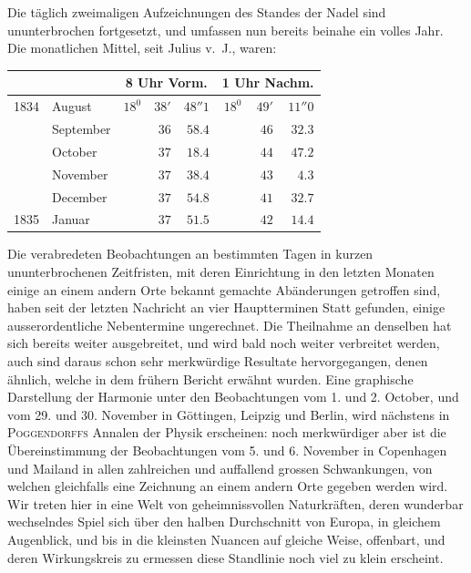 Die täglich zweimaligen Aufzeichnungen des Standes der Nadel sind ununterbrochen fortgesetzt, und umfassen nun bereits beinahe ein volles Jahr. Die monatlichen Mittel, seit Julius v.\ J., waren:
\begin{center}
\begin{tabular}{rl|rrr|rrr}
 & & \multicolumn{3}{c|}{8 Uhr Vorm.} & \multicolumn{3}{c}{1 Uhr Nachm.}\\\hline
1834 & August & $18^0$ & $38'$ & $48''1$ & $18^0$ & $49'$ & $11''0$\\
 & September & & $36$ & $58.4$ & & $46$ & $32.3$\\
 & October & & $37$ & $18.4$ & & $44$ & $47.2$\\
 & November & & $37$ & $38.4$ & & $43$ & $4.3$\\
 & December & & $37$ & $54.8$ & & $41$ & $32.7$\\
1835 & Januar & & $37$ & $51.5$ & & $42$ & $14.4$
\end{tabular}
\end{center}

Die verabredeten Beobachtungen an bestimmten Tagen in kurzen ununterbrochenen Zeitfristen, mit deren Einrichtung in den letzten Monaten einige an einem andern Orte bekannt gemachte Abänderungen getroffen sind, haben seit der letzten Nachricht an vier Hauptterminen Statt gefunden, einige ausserordentliche Nebentermine ungerechnet. Die Theilnahme an denselben hat sich bereits weiter ausgebreitet, und wird bald noch weiter verbreitet werden, auch sind daraus schon sehr merkwürdige Resultate hervorgegangen, denen ähnlich, welche in dem frühern Bericht erwähnt wurden. Eine graphische Darstellung der Harmonie unter den Beobachtungen vom 1. und 2. October, und vom 29. und 30. November in Göttingen, Leipzig und Berlin, wird nächstens in \textsc{Poggendorffs} Annalen der Physik erscheinen: noch merkwürdiger aber ist die Übereinstimmung der Beobachtungen vom 5. und 6. November in Copenhagen und Mailand in allen zahlreichen und auffallend grossen Schwankungen, von welchen gleichfalls eine Zeichnung an einem andern Orte gegeben werden wird. Wir treten hier in eine Welt von geheimnissvollen Naturkräften, deren wunderbar wechselndes Spiel sich über den halben Durchschnitt von Europa, in gleichem Augenblick, und bis in die kleinsten Nuancen auf gleiche Weise, offenbart, und deren Wirkungskreis zu ermessen diese Standlinie noch viel zu klein erscheint.


